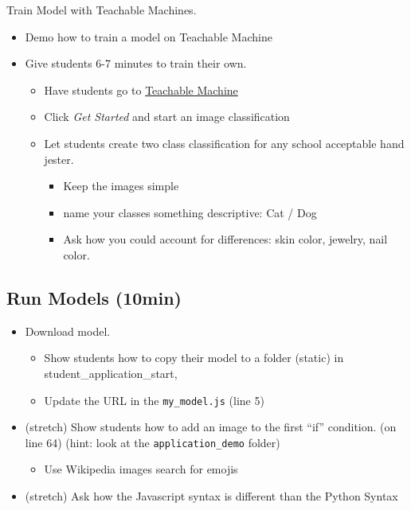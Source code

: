 \documentclass[
]{report}
\providecommand{\tightlist}{%
  \setlength{\itemsep}{0pt}\setlength{\parskip}{0pt}}\usepackage{longtable,booktabs,array}
\begin{document}
Train Model with Teachable Machines.

\begin{itemize}
\tightlist
\item
  Demo how to train a model on Teachable Machine
\item
  Give students 6-7 minutes to train their own.

  \begin{itemize}
  \tightlist
  \item
    Have students go to
    \href{https://teachablemachine.withgoogle.com/}{Teachable Machine}
  \item
    Click \emph{Get Started} and start an image classification
  \item
    Let students create two class classification for any school
    acceptable hand jester.

    \begin{itemize}
    \tightlist
    \item
      Keep the images simple
    \item
      name your classes something descriptive: Cat / Dog
    \item
      Ask how you could account for differences: skin color, jewelry,
      nail color.
    \end{itemize}
  \end{itemize}
\end{itemize}

\hypertarget{run-models-10min}{%
\subsection{Run Models (10min)}\label{run-models-10min}}

\begin{itemize}
\tightlist
\item
  Download model.

  \begin{itemize}
  \tightlist
  \item
    Show students how to copy their model to a folder (static) in
    student\_application\_start,
  \item
    Update the URL in the \texttt{my\_model.js} (line 5)
  \end{itemize}
\item
  (stretch) Show students how to add an image to the first ``if''
  condition. (on line 64) (hint: look at the \texttt{application\_demo}
  folder)

  \begin{itemize}
  \tightlist
  \item
    Use Wikipedia images search for emojis
  \end{itemize}
\item
  (stretch) Ask how the Javascript syntax is different than the Python
  Syntax
\end{itemize}
\end{document}
